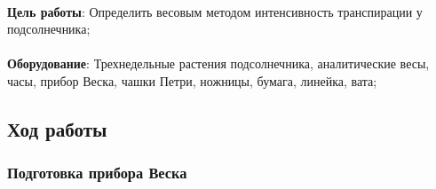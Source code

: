 
	

\begin{footnotesize}

\paragraph*{}\textbf{Цель работы}: Определить весовым методом интенсивность транспирации у подсолнечника;

\paragraph*{}\textbf{Оборудование}: Трехнедельные растения подсолнечника, аналитические весы, часы, прибор Веска, чашки Петри, ножницы, бумага, линейка, вата;

\end{footnotesize}

\subsection*{Ход работы}

\subsubsection*{Подготовка прибора Веска}

